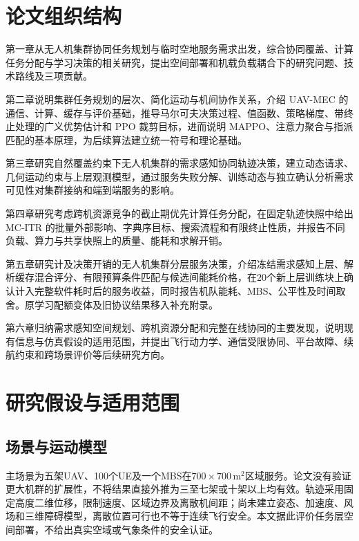 \section{论文组织结构}
\label{sec:arrangement}

第一章从无人机集群协同任务规划与临时空地服务需求出发，综合协同覆盖、计算任务分配与学习决策的相关研究，提出空间部署和机载负载耦合下的研究问题、技术路线及三项贡献。

第二章说明集群任务规划的层次、简化运动与机间协作关系，介绍 UAV-MEC 的通信、计算、缓存与评价基础，推导马尔可夫决策过程、值函数、策略梯度、带终止处理的广义优势估计和 PPO 裁剪目标，进而说明 MAPPO、注意力聚合与指派匹配的基本原理，为后续算法建立统一符号和理论基础。

第三章研究自然覆盖约束下无人机集群的需求感知协同轨迹决策，建立动态请求、几何运动约束与上层观测模型，通过服务失败分解、训练动态与独立确认分析需求可见性对集群接纳和端到端服务的影响。

第四章研究考虑跨机资源竞争的截止期优先计算任务分配，在固定轨迹快照中给出 MC-ITR 的批量外部影响、字典序目标、搜索流程和有限终止性质，并报告不同负载、算力与共享快照上的质量、能耗和求解开销。

第五章研究计及决策开销的无人机集群分层服务决策，介绍冻结需求感知上层、解析缓存混合评分、有限预算条件匹配与候选间能耗价格，在20个新上层训练块上确认计入完整软件耗时后的服务收益，同时报告机队能耗、MBS、公平性及时间取舍。原学习配额变体及旧协议结果移入补充附录。

第六章归纳需求感知空间规划、跨机资源分配和完整在线协同的主要发现，说明现有信息与仿真假设的适用范围，并提出飞行动力学、通信受限协同、平台故障、续航约束和跨场景评价等后续研究方向。

\section{研究假设与适用范围}
\label{sec:assumptions-and-scope}
\subsection{场景与运动模型}
\label{sec:scale-assumptions}
\label{sec:motion-assumptions}
主场景为五架UAV、100个UE及一个MBS在$700\times700\,\mathrm{m}^2$区域服务。论文没有验证更大机群的扩展性，不将结果直接外推为三至七架或十架以上均有效。轨迹采用固定高度二维位移，限制速度、区域边界及离散机间距；尚未建立姿态、加速度、风场和三维障碍模型，离散位置可行也不等于连续飞行安全。本文据此评价任务层空间部署，不给出真实空域或气象条件的安全认证。

